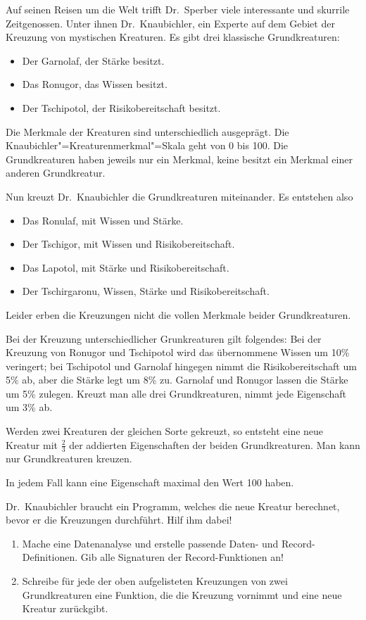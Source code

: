\begin{aufgabe}
  \label{aufgabe:knaubichler}
  Auf seinen Reisen um die Welt trifft Dr.~Sperber
  viele interessante und skurrile Zeitgenossen. Unter ihnen
  Dr.~Knaubichler, ein Experte auf dem Gebiet der Kreuzung von
  mystischen Kreaturen.  Es gibt drei klassische Grundkreaturen:

  \begin{itemize}
  \item Der Garnolaf, der Stärke besitzt.
  \item Das Ronugor, das Wissen besitzt.
  \item Der Tschipotol, der Risikobereitschaft besitzt.
  \end{itemize}
  Die Merkmale der Kreaturen sind unterschiedlich ausgeprägt.  Die
  Knaubichler"=Kreaturenmerkmal"=Skala geht von 0 bis 100.  Die
  Grundkreaturen haben jeweils nur ein Merkmal, keine besitzt ein
  Merkmal einer anderen Grundkreatur.

  Nun kreuzt Dr.~Knaubichler die Grundkreaturen miteinander. Es
  entstehen also
  \begin{itemize}
  \item Das Ronulaf, mit Wissen und Stärke.
  \item Der Tschigor, mit Wissen und Risikobereitschaft.
  \item Das Lapotol, mit Stärke und Risikobereitschaft.
  \item Der Tschirgaronu, Wissen, Stärke und Risikobereitschaft.
  \end{itemize}
  Leider erben die Kreuzungen nicht die vollen Merkmale beider
  Grundkreaturen.

  Bei der Kreuzung unterschiedlicher Grunkreaturen gilt folgendes:
  Bei der Kreuzung von Ronugor und Tschipotol wird
  das übernommene Wissen um 10\% veringert; bei Tschipotol und
  Garnolaf hingegen nimmt die Risikobereitschaft um 5\% ab, aber die
  Stärke legt um 8\% zu. Garnolaf und Ronugor lassen die Stärke um 5\%
  zulegen. Kreuzt man alle drei Grundkreaturen, nimmt jede Eigenschaft
  um 3\% ab.
  
  Werden zwei Kreaturen der gleichen Sorte gekreuzt, so entsteht eine
  neue Kreatur mit $\frac{2}{3}$ der addierten Eigenschaften der
  beiden Grundkreaturen. Man kann nur Grundkreaturen kreuzen.

  In jedem Fall kann eine Eigenschaft maximal den Wert 100
  haben.
    
  Dr.~Knaubichler braucht ein Programm, welches die neue Kreatur
  berechnet, bevor er die Kreuzungen durchführt.  Hilf ihm
  dabei!
  
  \begin{enumerate}

  \item Mache eine Datenanalyse und erstelle
    passende Daten- und Record-Definitionen.  Gib alle
    Signaturen der Record-Funktionen an!

  \item Schreibe für jede der oben aufgelisteten
    Kreuzungen von zwei Grundkreaturen eine Funktion, die die Kreuzung
    vornimmt und eine neue Kreatur zurückgibt.
  \end{enumerate}
\end{aufgabe}


